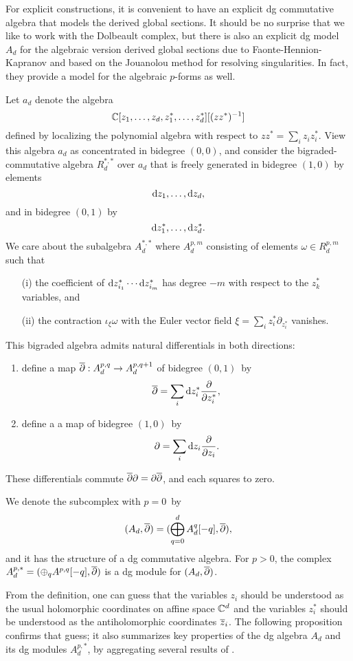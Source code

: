 For explicit constructions, it is convenient to have an explicit dg commutative algebra that models the derived global sections.
It should be no surprise that we like to work with the Dolbeault complex,
but there is also an explicit dg model $A_d$ for the algebraic version derived global sections due to Faonte-Hennion-Kapranov \cite{FHK} and based on the Jouanolou method for resolving singularities. 
In fact, they provide a model for the algebraic $p$-forms as well.

\begin{dfn}
Let $a_d$ denote the algebra  
\[
\mathbb C[z_1,\ldots,z_d, z_1^*,\ldots,z_d^*][(z z^*)^{-1}]
\]
defined by localizing the polynomial algebra with respect to $zz^* = \sum_i z_i z^*_i$.
View this algebra $a_d$ as concentrated in bidegree $(0,0)$, 
and consider the bigraded-commutative algebra $R^{*,*}_d$ over $a_d$ that is freely generated in bidegree $(1,0)$ by elements
\[
{\rm d} z_1,\ldots , {\rm d} z_d,
\] 
and in bidegree $(0,1)$ by
\[
{\rm d} z_1^*,\ldots, {\rm d} z_d^*.
\]
We care about the subalgebra $A^{*,*}_d$ where $A^{p,m}_d$ consisting of elements $\omega \in R^{p,m}_d$ such that
\begin{itemize}
\item[(i)] the coefficient of ${\rm d} z^*_{i_1} \cdots {\rm d} z^*_{i_m}$ has degree $-m$ with respect to the $z_k^*$ variables, and
\item[(ii)] the contraction $\iota_\xi \omega$ with the Euler vector field $\xi = \sum_{i} z_i^* \partial_{z_{i}^*}$ vanishes.
\end{itemize}
This bigraded algebra admits natural differentials in both directions:
\begin{enumerate}
\item define a map $\overline{\partial} : A_d^{p,q} \to A_d^{p,q+1}$ of bidegree $(0,1)$~by
\[
\overline{\partial} = \sum_i {\rm d} z^*_i \frac{\partial}{\partial z_i^*},
\]
\item define a a map of bidegree $(1,0)$~by
\[
\partial = \sum_i {\rm d} z_i \frac{\partial}{\partial z_i} .
\]
\end{enumerate}
These differentials commute $\overline{\partial} \partial = \partial \overline{\partial}$,
and each squares to zero.
\end{dfn}

We denote the subcomplex with $p=0$~by 
\[
(A_d, \overline{\partial}) = (\bigoplus_{q = 0}^d A_d^{q}[-q], \overline{\partial}),
\] 
and it has the structure of a dg commutative algebra.
For $p>0$, the complex $A^{p,*}_d = (\oplus_q A^{p,q}[-q], \overline{\partial})$ is a dg module for $(A_d, \overline{\partial})$.

From the definition, one can guess that the variables $z_i$ should be understood as the usual holomorphic coordinates on affine space $\mathbb C^d$ and the variables $z^*_i$ should be understood as the antiholomorphic coordinates $\overline{z}_i$.
The following proposition confirms that guess;
it also summarizes key properties of the dg algebra $A_d$ and its dg modules $A_{d}^{p,*}$,
by aggregating several results of \cite{FHK}.

